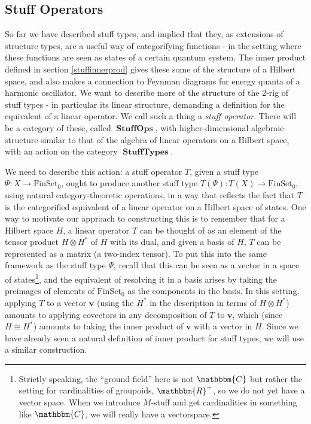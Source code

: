 \documentclass{amsart} \usepackage{amsmath,amssymb,bbm}
\newcommand{\opname}[1]{\operatorname{#1}}
\newcommand{\bldsym}[1]{\boldsymbol{#1}}
\newcommand{\catname}[1]{\boldsymbol{\opname{{#1}}}}
\newcommand{\FSN}{\catname{FinSet_0}}
\begin{document}
\subsection{Stuff Operators}

So far we have described stuff types, and implied that they, as
extensions of structure types, are a useful way of categorifying
functions - in the setting where these functions are seen as states of
a certain quantum system.  The inner product defined in section
\ref{stuffinnerprod} gives these some of the structure of a Hilbert
space, and also makes a connection to Feynman diagrams for energy
quanta of a harmonic oscillator.  We want to describe more of the
structure of the 2-rig of stuff types - in particular its linear
structure, demanding a definition for the equivalent of a linear
operator.  We call such a thing a {\textit{stuff operator}}.  There will
be a category of these, called $\catname{StuffOps}$, with
higher-dimensional algebraic structure similar to that of the algebra
of linear operators on a Hilbert space, with an action on the category
$\catname{StuffTypes}$.

We need to describe this action: a stuff operator $T$, given a stuff
type $\Psi:X\rightarrow\FSN$, ought to produce another stuff type
$T(\Psi):T(X)\rightarrow\FSN$, using natural category-theoretic
operations, in a way that reflects the fact that $T$ is the
categorified equivalent of a linear operator on a Hilbert space of
states.  One way to motivate our approach to constructing this is to
remember that for a Hilbert space $H$, a linear operator $T$ can be
thought of as an element of the tensor product $H \otimes H^{\ast}$ of
$H$ with its dual, and given a basis of $H$, $T$ can be represented as
a matrix (a two-index tensor).  To put this into the same framework as
the stuff type $\Psi$, recall that this can be seen as a vector in a
space of states{\footnote{Strictly speaking, the ``ground field'' here
is not $\mathbbm{C}$ but rather the setting for cardinalities of
groupoids, $\mathbbm{R}^+$, so we do not yet have a vector space.
When we introduce $M$-stuff and get cardinalities in something like
$\mathbbm{C}$, we will really have a vectorspace.}}, and the
equivalent of resolving it in a basis arises by taking the preimages
of elements of $\FSN$ as the components in the basis.  In this
setting, applying $T$ to a vector $\bldsym{v}$ (using the $H^{\ast}$
in the description in terms of $H \otimes H^{\ast}$) amounts to
applying covectors in any decomposition of $T$ to $\bldsym{v}$, which
(since $H \cong H^{\ast}$) amounts to taking the inner product of
$\bldsym{v}$ with a vector in $H$.  Since we have already seen a
natural definition of inner product for stuff types, we will use a
similar construction.
\end{document}

